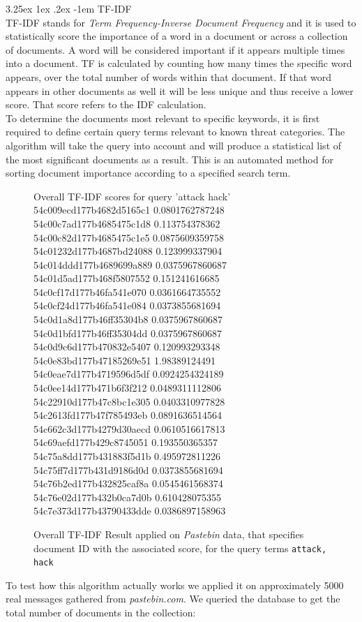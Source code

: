 \documentclass[12pt]{article}
\makeatletter
\renewcommand\paragraph{\@startsection{paragraph}{5}{\z@}%
  {3.25ex \@plus1ex \@minus.2ex}%
  {-1em}%
  {\normalfont\normalsize\bfseries}}
\makeatother
\begin{document}
\paragraph{TF-IDF}
\hfill \break
\\
TF-IDF \cite{tf-idf} stands for \textit{Term Frequency-Inverse Document Frequency} and it is used to statistically score the importance of a word in a document or across a collection of documents. A word will be considered important if it appears multiple times into a document. TF is calculated by counting how many times the specific word appears, over the total number of words within that document. If that word appears in other documents as well it will be less unique and thus receive a lower score. That score refers to the IDF calculation. 
\hfill \break 
\\
To determine the documents most relevant to specific keywords, it is first required to define certain query terms relevant to known threat categories. The algorithm will take the query into account and will produce a statistical list of the most significant documents as a result. This is an automated method for sorting document importance according to a specified search term. 
\begin{figure}[h!] 
\begin{footnotesize}
\begin{spverbatim}
Overall TF-IDF scores for query 'attack hack'
54c009ecd177b4682d5165c1 0.0801762787248
54c00c7ad177b4685475c1d8 0.113754378362
54c00c82d177b4685475c1e5 0.0875609359758
54c01232d177b4687bd24088 0.123999337904
54c014ddd177b4689699a889 0.0375967860687
54c01d5ad177b468f5807552 0.151241616685
54c0cf17d177b46fa541e070 0.0361664735552
54c0cf24d177b46fa541e084 0.0373855681694
54c0d1a8d177b46ff35304b8 0.0375967860687
54c0d1bfd177b46ff35304dd 0.0375967860687
54c0d9c6d177b470832e5407 0.120993293348
54c0e83bd177b47185269e51 1.98389124491
54c0eae7d177b4719596d5df 0.0924254324189
54c0ee14d177b471b6f3f212 0.0489311112806
54c22910d177b47c8bc1e305 0.0403310977828
54c2613fd177b47f785493eb 0.0891636514564
54c662c3d177b4279d30aecd 0.0610516617813
54c69aefd177b429c8745051 0.193550365357
54c75a8dd177b431883f5d1b 0.495972811226
54c75ff7d177b431d9186d0d 0.0373855681694
54c76b2ed177b432825caf8a 0.0545461568374
54c76e02d177b432b0ca7d0b 0.610428075355
54c7e373d177b43790433dde 0.0386897158963
\end{spverbatim}
\end{footnotesize}
\captionsetup{font=small}
\caption{Overall TF-IDF Result applied on \textit{Pastebin} data, that specifies document ID with the associated score, for the query terms \texttt{attack, hack}}
\label{fig:overall}
\end{figure}
To test how this algorithm actually works we applied it on approximately 5000 real messages gathered from \textit{pastebin.com}. We queried the database to get the total number of documents in the collection:
\end{document}
